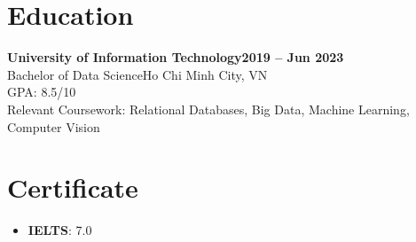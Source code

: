 \documentclass[letterpaper,10pt]{article}
\newcommand{\heading}[2]{
  \hspace{10pt}#1\hfill#2\\
}
\newcommand{\headingBf}[2]{
  \heading{\textbf{#1}}{\textbf{#2}}
}
\begin{document}

\section{Education}

\headingBf{University of Information Technology}{2019 -- Jun 2023}
\heading{Bachelor of Data Science}{Ho Chi Minh City, VN}
\heading{GPA: 8.5/10}{}
\heading{Relevant Coursework: Relational Databases, Big Data, Machine Learning, Computer Vision}{}


\section{Certificate}

\begin{itemize}
  \item \textbf{IELTS}: 7.0
\end{itemize}
\end{document}
